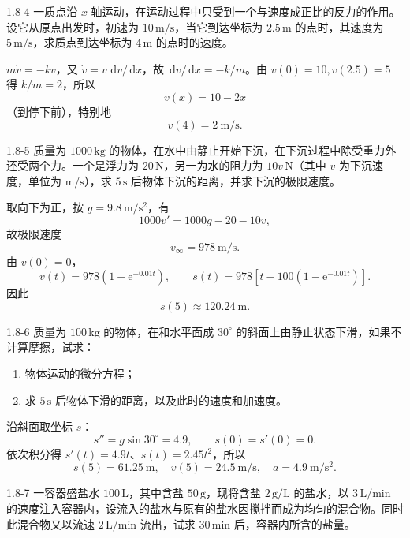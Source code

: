 \documentclass[UTF8,a4paper,11pt]{ctexart}
\newcommand{\dd}{\,\mathrm d}
\newcommand{\e}{\mathrm e}
\begin{document}
\begin{problem}{1.8-4}
一质点沿 $x$ 轴运动，在运动过程中只受到一个与速度成正比的反力的作用。设它从原点出发时，初速为 $10\,\mathrm{m/s}$，当它到达坐标为 $2.5\,\mathrm m$ 的点时，其速度为 $5\,\mathrm{m/s}$，求质点到达坐标为 $4\,\mathrm m$ 的点时的速度。
\end{problem}

\begin{solution}
$m\dot v=-kv$，又 $\dot v=v\,\dd v/\dd x$，故 $\dd v/\dd x=-k/m$。由 $v(0)=10,v(2.5)=5$ 得 $k/m=2$，所以
\[
v(x)=10-2x
\]
（到停下前），特别地
\[
\boxed{v(4)=2\ \mathrm{m/s}}.
\]
\end{solution}

\begin{problem}{1.8-5}
质量为 $1000\,\mathrm{kg}$ 的物体，在水中由静止开始下沉，在下沉过程中除受重力外还受两个力。一个是浮力为 $20\,\mathrm N$，另一为水的阻力为 $10v\,\mathrm N$（其中 $v$ 为下沉速度，单位为 $\mathrm{m/s}$），求 $5\,\mathrm s$ 后物体下沉的距离，并求下沉的极限速度。
\end{problem}

\begin{solution}
取向下为正，按 $g=9.8\ \mathrm{m/s^2}$，有
\[
1000v'=1000g-20-10v,
\]
故极限速度
\[
\boxed{v_\infty=978\ \mathrm{m/s}}.
\]
由 $v(0)=0$，
\[
v(t)=978(1-\e^{-0.01t}),\qquad
s(t)=978\left[t-100(1-\e^{-0.01t})\right].
\]
因此
\[
\boxed{s(5)\approx120.24\ \mathrm m}.
\]
\end{solution}

\begin{problem}{1.8-6}
质量为 $100\,\mathrm{kg}$ 的物体，在和水平面成 $30^\circ$ 的斜面上由静止状态下滑，如果不计算摩擦，试求：
  \begin{enumerate}[label=(\arabic*)]
    \item 物体运动的微分方程；
    \item 求 $5\,\mathrm s$ 后物体下滑的距离，以及此时的速度和加速度。
  \end{enumerate}
\end{problem}

\begin{solution}
沿斜面取坐标 $s$：
\[
\boxed{s''=g\sin30^\circ=4.9},\qquad s(0)=s'(0)=0.
\]
依次积分得 $s'(t)=4.9t$、$s(t)=2.45t^2$，所以
\[
\boxed{s(5)=61.25\ \mathrm m,\quad v(5)=24.5\ \mathrm{m/s},\quad a=4.9\ \mathrm{m/s^2}}.
\]
\end{solution}

\begin{problem}{1.8-7}
一容器盛盐水 $100\,\mathrm L$，其中含盐 $50\,\mathrm g$，现将含盐 $2\,\mathrm{g/L}$ 的盐水，以 $3\,\mathrm{L/min}$ 的速度注入容器内，设流入的盐水与原有的盐水因搅拌而成为均匀的混合物。同时此混合物又以流速 $2\,\mathrm{L/min}$ 流出，试求 $30\,\mathrm{min}$ 后，容器内所含的盐量。
\end{problem}
\end{document}
